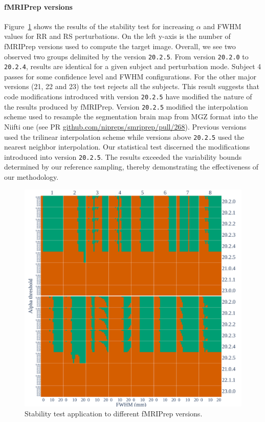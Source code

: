 \documentclass[lettersize,journal]{IEEEtran}
\newcommand{\fmriprep}{fMRIPrep\xspace}
\begin{document}
\paragraph*{\fmriprep versions} Figure~\ref{fig:version_bonferroni} shows the results of the stability test for increasing $\alpha$ and FWHM values for RR and RS perturbations. On the left y-axis is the number of \fmriprep versions used to compute the target image. Overall, we see two observed two groups delimited by the version \texttt{20.2.5}. From version \texttt{20.2.0} to \texttt{20.2.4}, results are identical for a given subject and perturbation mode. Subject 4 passes for some confidence level and FWHM configurations. For the other major versions (21, 22 and 23) the test rejects all the subjects. This result suggests that code modifications introduced with version \texttt{20.2.5} have modified the nature of the results produced by \fmriprep. Version \texttt{20.2.5} modified the interpolation scheme used to resample the segmentation brain map from MGZ format into the Niifti one (see PR \href{https://github.com/nipreps/smriprep/pull/268}{\url{github.com/nipreps/smriprep/pull/268}}). Previous versions used the trilinear interpolation scheme while versions above \texttt{20.2.5} used the nearest neighbor interpolation. Our statistical test discerned the modifications introduced into version \texttt{20.2.5}. The results exceeded the variability bounds determined by our reference sampling, thereby demonstrating the effectiveness of our methodology.


\begin{figure}
    \centering
    \includegraphics[width=\linewidth]{figures/fmriprep-versions/versions_fwe_bonferroni.pdf}
    \caption{Stability test application to different \fmriprep versions.}
    \label{fig:version_bonferroni}
\end{figure}
\end{document}
